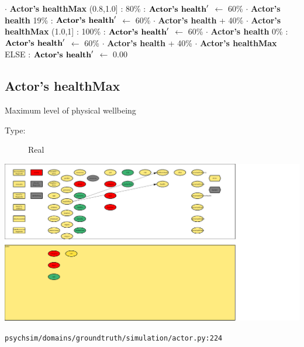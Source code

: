 \documentclass{article}%
\begin{document}
\begin{flushleft}
$\cdot$%
\textbf{Actor's healthMax}%
\linebreak%
\hspace*{4em}%
(0.8,1.0{]}%
: %
\linebreak%
\hspace*{6em}%
80\%%
: %
$\mbox{\textbf{Actor's health}} '$%
$\leftarrow$%
60\%%
$\cdot$%
\textbf{Actor's health}%
\linebreak%
\hspace*{6em}%
19\%%
: %
$\mbox{\textbf{Actor's health}} '$%
$\leftarrow$%
60\%%
$\cdot$%
\textbf{Actor's health}%
+%
40\%%
$\cdot$%
\textbf{Actor's healthMax}%
\linebreak%
\hspace*{4em}%
(1.0,1{]}%
: %
\linebreak%
\hspace*{6em}%
100\%%
: %
$\mbox{\textbf{Actor's health}} '$%
$\leftarrow$%
60\%%
$\cdot$%
\textbf{Actor's health}%
\linebreak%
\hspace*{6em}%
0\%%
: %
$\mbox{\textbf{Actor's health}} '$%
$\leftarrow$%
60\%%
$\cdot$%
\textbf{Actor's health}%
+%
40\%%
$\cdot$%
\textbf{Actor's healthMax}%
\linebreak%
\hspace*{2em}%
ELSE %
: %
$\mbox{\textbf{Actor's health}} '$%
$\leftarrow$%
0.00%
\end{flushleft}

%
\subsection{Actor's healthMax}%
\label{subsec:Actor's healthMax}%
Maximum level of physical wellbeing%
\begin{description}%
\item[Type:]%
Real%
\end{description}%
\includegraphics[width=\textwidth]{images/healthMaxOfActor.png}%
\begin{flushleft}%
\verb|psychsim/domains/groundtruth/simulation/actor.py:224|%
\end{flushleft}
\end{document}
